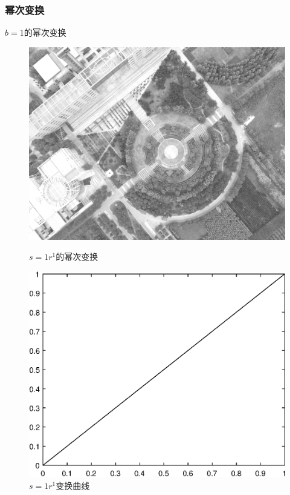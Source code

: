 \subsubsection{幂次变换}
$b=1$的幂次变换
\begin{figure}[H]
	\centering
	\begin{minipage}{0.45\linewidth}
		\includegraphics[width=\linewidth]{figure/DJI_0027_Gamma_100.png}
		\caption{$s=1r^1$的幂次变换}
	\end{minipage}
	\begin{minipage}{0.45\linewidth}
		\includegraphics[width=\linewidth]{figure/DJI_0027_Gamma_100_Graph.eps}
		\caption{$s=1r^1$变换曲线}
	\end{minipage}
\end{figure}

